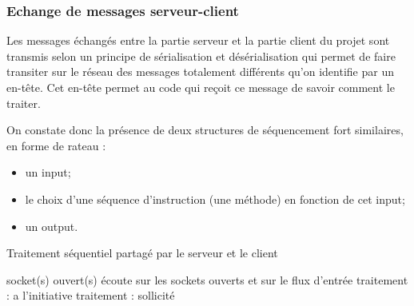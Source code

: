 \documentclass[a4paper,titlepage]{scrreprt}
\begin{document}
\subsubsection{Echange de messages serveur-client}
Les messages échangés entre la partie serveur et la partie client du projet sont transmis selon un principe de sérialisation et désérialisation qui permet de faire transiter sur le réseau des messages totalement différents qu'on identifie par un en-tête. Cet en-tête permet au code qui reçoit ce message de savoir comment le traiter.

 On constate donc la présence de deux structures de séquencement fort similaires, en forme de rateau :
 \begin{itemize}
   \item un input;
   \item le choix d'une séquence d'instruction (une méthode) en fonction de cet input;
   \item un output.
 \end{itemize}
 \begin{algorithm}
  \caption{Traitement séquentiel partagé par le serveur et le client}
  \begin{algorithmic}
  \REQUIRE socket(s) ouvert(s)
  \STATE écoute sur les sockets ouverts et sur le flux d'entrée
  \STATE traitement : a l'initiative
  \STATE traitement : sollicité
  \ENDIF
\end{algorithmic}
\label{pseudo-code-select}
\end{algorithm}
\end{document}
